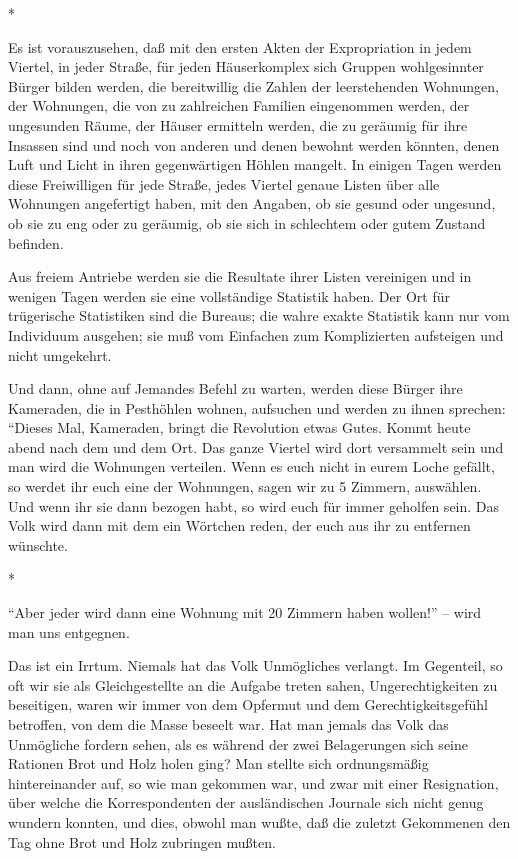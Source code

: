 \documentclass{scrbook}
\begin{document}
\begin{center}*\end{center}

Es ist vorauszusehen, daß mit den ersten Akten der Expropriation in jedem Viertel, in jeder Straße, für jeden Häuserkomplex sich Gruppen wohlgesinnter Bürger bilden werden, die bereitwillig die Zahlen der leerstehenden Wohnungen, der Wohnungen, die von zu zahlreichen Familien eingenommen werden, der ungesunden Räume, der Häuser ermitteln werden, die zu geräumig für ihre Insassen sind und noch von anderen und denen bewohnt werden könnten, denen Luft und Licht in ihren gegenwärtigen Höhlen mangelt. In einigen Tagen werden diese Freiwilligen für jede Straße, jedes Viertel genaue Listen über alle Wohnungen angefertigt haben, mit den Angaben, ob sie gesund oder ungesund, ob sie zu eng oder zu geräumig, ob sie sich in schlechtem oder gutem Zustand befinden.

Aus freiem Antriebe werden sie die Resultate ihrer Listen vereinigen und in wenigen Tagen werden sie eine vollständige Statistik haben. Der Ort für trügerische Statistiken sind die Bureaus; die wahre exakte Statistik kann nur vom Individuum ausgehen; sie muß vom Einfachen zum Komplizierten aufsteigen und nicht umgekehrt.

Und dann, ohne auf Jemandes Befehl zu warten, werden diese Bürger ihre Kameraden, die in Pesthöhlen wohnen, aufsuchen und werden zu ihnen sprechen: ``Dieses Mal, Kameraden, bringt die Revolution etwas Gutes. Kommt heute abend nach dem und dem Ort. Das ganze Viertel wird dort versammelt sein und man wird die Wohnungen verteilen. Wenn es euch nicht in eurem Loche gefällt, so werdet ihr euch eine der Wohnungen, sagen wir zu 5 Zimmern, auswählen. Und wenn ihr sie dann bezogen habt, so wird euch für immer geholfen sein. Das Volk wird dann mit dem ein Wörtchen reden, der euch aus ihr zu entfernen wünschte.

\begin{center}*\end{center}

``Aber jeder wird dann eine Wohnung mit 20 Zimmern haben wollen!'' – wird man uns entgegnen.

Das ist ein Irrtum. Niemals hat das Volk Unmögliches verlangt. Im Gegenteil, so oft wir sie als Gleichgestellte an die Aufgabe treten sahen, Ungerechtigkeiten zu beseitigen, waren wir immer von dem Opfermut und dem Gerechtigkeitsgefühl betroffen, von dem die Masse beseelt war. Hat man jemals das Volk das Unmögliche fordern sehen, als es während der zwei Belagerungen sich seine Rationen Brot und Holz holen ging? Man stellte sich ordnungsmäßig hintereinander auf, so wie man gekommen war, und zwar mit einer Resignation, über welche die Korrespondenten der ausländischen Journale sich nicht genug wundern konnten, und dies, obwohl man wußte, daß die zuletzt Gekommenen den Tag ohne Brot und Holz zubringen mußten.
\end{document}
